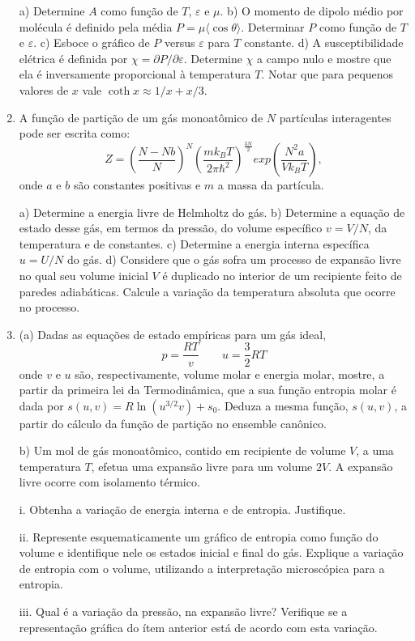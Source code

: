 \begin{enumerate}[start=1,label={\bfseries Q\arabic*.}]
a) Determine $A$ como função de $T$, $\varepsilon$ e $\mu$.
b) O momento de dipolo médio por molécula é definido pela média $P = \mu \langle \operatorname{cos} \theta \rangle$. Determinar $P$ como função de $T$ e $\varepsilon$.
c) Esboce o gráfico de $P$ versus $\varepsilon$ para $T$ constante.
d) A susceptibilidade elétrica é definida por $\chi = \partial P / \partial \varepsilon$. Determine $\chi$ a campo nulo e mostre que ela é inversamente proporcional à temperatura $T$. Notar que para pequenos valores de $x$ vale $\operatorname{coth} x \approx 1/x + x/3$.



\item A função de partição de um gás monoatômico de $N$ partículas interagentes pode ser escrita como:
$$
Z = \left(  \frac{N - Nb}{N}  \right)^{N} \left(  \frac{mk_{B}T}{2\pi \hbar^{2}}  \right)^{\frac{3N}{2}} exp \left(  \frac{N^{2} a}{V k_{B} T}  \right),
$$
onde $a$ e $b$ são constantes positivas e $m$ a massa da partícula.

a) Determine a energia livre de Helmholtz do gás.
b) Determine a equação de estado desse gás, em termos da pressão, do volume específico $v = V/N$, da temperatura e de constantes.
c) Determine a energia interna específica $u = U/N$ do gás.
d) Considere que o gás sofra um processo de expansão livre no qual seu volume inicial $V$ é duplicado no interior de um recipiente feito de paredes adiabáticas. Calcule a variação da temperatura absoluta que ocorre no processo.



\item (a) Dadas as equações de estado empíricas para um gás ideal,
$$
p = \frac{RT}{v} \quad \quad u = \frac{3}{2} RT
$$
onde $v$ e $u$ são, respectivamente, volume molar e energia molar, mostre, a partir da primeira lei da Termodinâmica, que a sua função entropia molar é dada por $s(u, v) = R \operatorname{ln} (u^{3/2} v) + s_{0}$. Deduza a mesma função, $s(u,v)$, a partir do cálculo da função de partição no ensemble canônico.


  b) Um mol de gás monoatômico, contido em recipiente de volume $V$, a uma temperatura $T$, efetua uma expansão livre para um volume $2V$. A expansão livre ocorre com isolamento térmico.
      
        \item[i.] Obtenha a variação de energia interna e de entropia. Justifique.
        \item[ii.] Represente esquematicamente um gráfico de entropia como função do volume e identifique nele os estados inicial e final do gás. Explique a variação de entropia com o volume, utilizando a interpretação microscópica para a entropia.
        \item[iii.] Qual é a variação da pressão, na expansão livre? Verifique se a representação gráfica do ítem anterior está de acordo com esta variação.
      




\end{enumerate}
